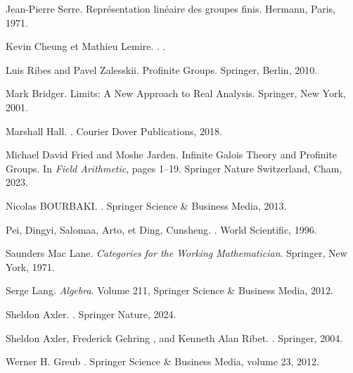 \documentclass[a4paper, 14pt]{report}
\begin{document}
\begin{onehalfspace}
{\begin{thebibliography}{99}
				Jean-Pierre Serre.
				\newblock Repr{\'e}sentation lin{\'e}aire des groupes finis.
				\newblock Hermann, Paris, 1971.
				
				Kevin  Cheung et Mathieu Lemire.
				.
				.
				
				
				Luis Ribes and Pavel Zalesskii.
				\newblock Profinite Groups.
				\newblock Springer, Berlin, 2010.
				
				
				Mark  Bridger.
				\newblock Limits: A New Approach to Real Analysis.
				\newblock Springer, New York, 2001.
				
				Marshall Hall.
				.
				\newblock Courier Dover Publications, 2018.
				
				
				Michael David Fried and Moshe Jarden.
				\newblock Infinite Galois Theory and Profinite Groups.
				\newblock In {\em Field Arithmetic}, pages 1--19. Springer Nature Switzerland, Cham, 2023.
				
				Nicolas BOURBAKI. 
				.
				\newblock Springer Science \& Business Media, 2013.
				
				Pei, Dingyi, Salomaa, Arto, et Ding, Cunsheng.
				.
				\newblock World Scientific, 1996.
				
				Saunders Mac Lane.
				\newblock \emph{Categories for the Working Mathematician}.
				\newblock Springer, New York, 1971.
				
				Serge Lang.
				\newblock \emph{Algebra}.
				\newblock Volume 211, Springer Science \& Business Media, 2012.
				
				
				Sheldon Axler.
				.
				\newblock Springer Nature, 2024.
				
				Sheldon Axler, Frederick Gehring , and Kenneth Alan Ribet.
				.
				\newblock Springer, 2004.
				
				
				Werner H. Greub
				.
				\newblock Springer Science \& Business Media, volume 23, 2012.
				

\end{thebibliography}}
\end{onehalfspace}
\end{document}
